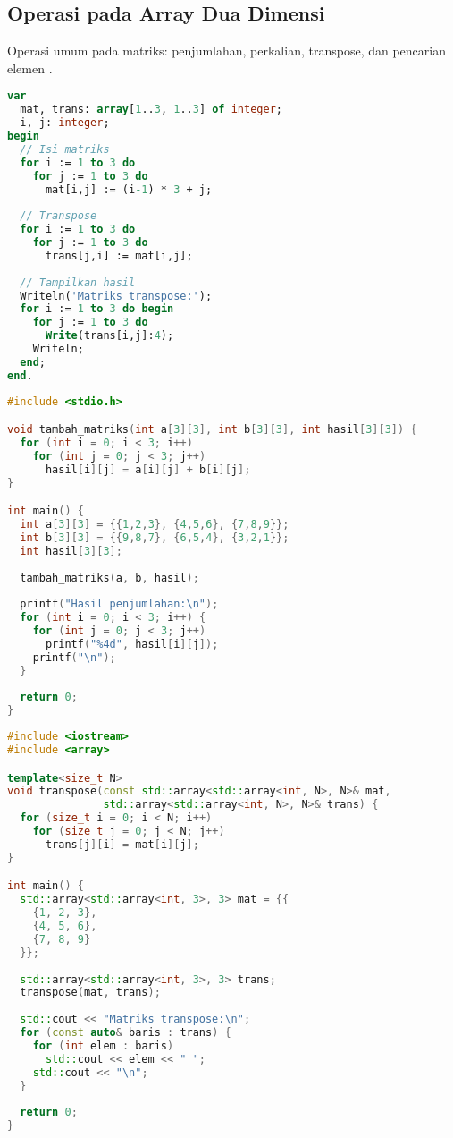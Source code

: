 \documentclass[../main.tex]{subfiles}
\begin{document}
\subsection{Operasi pada Array Dua Dimensi}

Operasi umum pada matriks: penjumlahan, perkalian, transpose, dan pencarian elemen \parencite{geeksforgeeks-matrix-operations}.

\begin{lstlisting}[language=Pascal, caption={Transpose matriks di Pascal}]
var
  mat, trans: array[1..3, 1..3] of integer;
  i, j: integer;
begin
  // Isi matriks
  for i := 1 to 3 do
    for j := 1 to 3 do
      mat[i,j] := (i-1) * 3 + j;
  
  // Transpose
  for i := 1 to 3 do
    for j := 1 to 3 do
      trans[j,i] := mat[i,j];
  
  // Tampilkan hasil
  Writeln('Matriks transpose:');
  for i := 1 to 3 do begin
    for j := 1 to 3 do
      Write(trans[i,j]:4);
    Writeln;
  end;
end.
\end{lstlisting}

\begin{lstlisting}[language=C, caption={Penjumlahan matriks di C}]
#include <stdio.h>

void tambah_matriks(int a[3][3], int b[3][3], int hasil[3][3]) {
  for (int i = 0; i < 3; i++)
    for (int j = 0; j < 3; j++)
      hasil[i][j] = a[i][j] + b[i][j];
}

int main() {
  int a[3][3] = {{1,2,3}, {4,5,6}, {7,8,9}};
  int b[3][3] = {{9,8,7}, {6,5,4}, {3,2,1}};
  int hasil[3][3];
  
  tambah_matriks(a, b, hasil);
  
  printf("Hasil penjumlahan:\n");
  for (int i = 0; i < 3; i++) {
    for (int j = 0; j < 3; j++)
      printf("%4d", hasil[i][j]);
    printf("\n");
  }
  
  return 0;
}
\end{lstlisting}

\begin{lstlisting}[language=C++, caption={Operasi matriks di C++}]
#include <iostream>
#include <array>

template<size_t N>
void transpose(const std::array<std::array<int, N>, N>& mat,
               std::array<std::array<int, N>, N>& trans) {
  for (size_t i = 0; i < N; i++)
    for (size_t j = 0; j < N; j++)
      trans[j][i] = mat[i][j];
}

int main() {
  std::array<std::array<int, 3>, 3> mat = {{
    {1, 2, 3},
    {4, 5, 6},
    {7, 8, 9}
  }};
  
  std::array<std::array<int, 3>, 3> trans;
  transpose(mat, trans);
  
  std::cout << "Matriks transpose:\n";
  for (const auto& baris : trans) {
    for (int elem : baris)
      std::cout << elem << " ";
    std::cout << "\n";
  }
  
  return 0;
}
\end{lstlisting}
\end{document}
